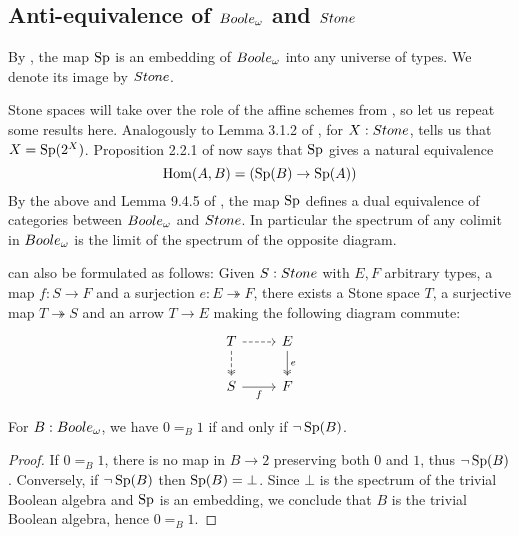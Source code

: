 \subsection{Anti-equivalence of $\Boole$ and $\Stone$}
By , the map $\operatorname{Sp}$ is an embedding of $\Boole$ into any universe of types. 
We denote its image by $\Stone$. 

\begin{remark}\label{SpIsAntiEquivalence}
Stone spaces will take over the role of the affine schemes from \cite{draft}, 
so let us repeat some results here. 
Analogously to Lemma 3.1.2 of \cite{draft}, 
for $X:\Stone$,  tells us that $X = \operatorname{Sp}(2^X)$.
%
Proposition 2.2.1 of \cite{draft} now says that 
$\operatorname{Sp}$ gives a natural equivalence 
\[
   \mathrm{Hom}(A, B) = (\operatorname{Sp}(B) \to \operatorname{Sp}(A))
\]
%
By the above and Lemma 9.4.5 of \cite{hott}, 
the map $\operatorname{Sp}$ defines a dual equivalence of categories between $\Boole$ and $\Stone$.
In particular the spectrum of any colimit in $\Boole$ is the limit of 
the spectrum of the opposite diagram. 
\end{remark}
\begin{remark}\label{LocalChoiceSurjectionForm}
   can also be formulated as follows:
  Given $S:\Stone$ with $E,F$ arbitrary types, a map $f:S \to F$ and a 
  surjection $e:E \twoheadrightarrow F$, 
  there exists a Stone space $T$, a surjective map 
  $T\twoheadrightarrow S$ and an arrow $T\to E$ making the following diagram commute:
    \[\begin{tikzcd}
      T \arrow[d,dashed, two heads ] \arrow[r,dashed]&  E \arrow[d,""',two heads, "e"]\\
      S  \arrow[r, swap,"f"] & F
    \end{tikzcd}\]  
\end{remark}

\begin{lemma}\label{SpectrumEmptyIff01Equal}
  For $B:\Boole$, we have $0=_B1$ if and only if $\neg \operatorname{Sp}(B)$.
\end{lemma}
\begin{proof}
  If $0=_B1$, there is no map in $B\to 2$ preserving both $0$ and $1$, thus $\neg \operatorname{Sp}(B)$. 
  Conversely, if $\neg \operatorname{Sp}(B)$ then 
  $\operatorname{Sp}(B)=\bot$. Since $\bot$ is the spectrum of the trivial Boolean algebra and $\operatorname{Sp}$ is an embedding, we conclude that $B$ is the trivial Boolean algebra, hence $0=_B1$. 
\end{proof}

